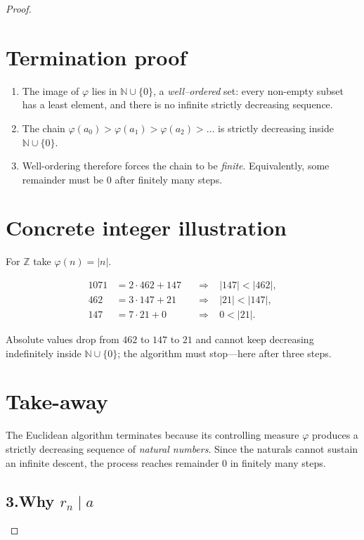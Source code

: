 \documentclass[12pt]{article}
\theoremstyle{definition} %
\theoremstyle{plain} %
\begin{document}
\begin{proof}
\medskip
\section*{Termination proof}

\begin{enumerate}
  \item The image of \(\varphi\) lies in \(\mathbb N\cup\{0\}\),  
        a \emph{well–ordered} set:  
        every non-empty subset has a least element, and
        there is no infinite strictly decreasing sequence.
  \item The chain  
        \(\varphi(a_{0})>\varphi(a_{1})>\varphi(a_{2})>\dots\)  
        is strictly decreasing inside \(\mathbb N\cup\{0\}\).
  \item Well-ordering therefore forces the chain to be \emph{finite}.  
        Equivalently, some remainder must be \(0\) after finitely many steps.
\end{enumerate}

\medskip
\section*{Concrete integer illustration}

For \(\mathbb Z\) take \(\varphi(n)=|n|\).

\[
   \begin{aligned}
   1071 &= 2\cdot 462 + 147 \quad &\Longrightarrow& \;|147|<|462|,\\
    462 &= 3\cdot 147 +  21 \quad &\Longrightarrow& \;| 21|<|147|,\\
    147 &= 7\cdot  21 +   0 \quad &\Longrightarrow& \; 0 < |21|.
   \end{aligned}
\]

Absolute values drop from \(462\) to \(147\) to \(21\) and cannot keep
decreasing indefinitely inside \(\mathbb N\cup\{0\}\); the algorithm
must stop—here after three steps.

\medskip
\section*{Take-away}

The Euclidean algorithm terminates because its controlling
measure \(\varphi\) produces a strictly decreasing sequence of
\emph{natural numbers}.  
Since the naturals cannot sustain an infinite descent, the process
reaches remainder \(0\) in finitely many steps.
\bigskip
\subsection*{3.\;Why \(r_{n}\mid a\)}


\end{proof}
\end{document}
